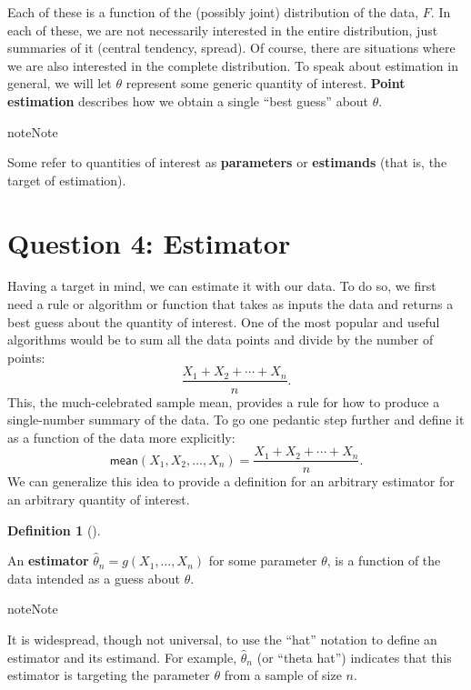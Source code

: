 \documentclass[
  13pt,
  letterpaper,
  DIV=11,
  numbers=noendperiod]{scrreprt}
\theoremstyle{plain}
\theoremstyle{plain}
\theoremstyle{definition}
\newtheorem{definition}{Definition}[chapter]
\theoremstyle{definition}
\theoremstyle{remark}
\begin{document}
Each of these is a function of the (possibly joint) distribution of the
data, \(F\). In each of these, we are not necessarily interested in the
entire distribution, just summaries of it (central tendency, spread). Of
course, there are situations where we are also interested in the
complete distribution. To speak about estimation in general, we will let
\(\theta\) represent some generic quantity of interest. \textbf{Point
estimation} describes how we obtain a single ``best guess'' about
\(\theta\).

\begin{bookcallout}{note}{Note}

Some refer to quantities of interest as \textbf{parameters} or
\textbf{estimands} (that is, the target of estimation).

\end{bookcallout}

\section{Question 4: Estimator}\label{question-4-estimator-1}

Having a target in mind, we can estimate it with our data. To do so, we
first need a rule or algorithm or function that takes as inputs the data
and returns a best guess about the quantity of interest. One of the most
popular and useful algorithms would be to sum all the data points and
divide by the number of points: \[
\frac{X_1 + X_2 + \cdots + X_n}{n}.
\] This, the much-celebrated sample mean, provides a rule for how to
produce a single-number summary of the data. To go one pedantic step
further and define it as a function of the data more explicitly: \[
\textsf{mean}(X_1, X_2, \ldots, X_n) = \frac{X_1 + X_2 + \cdots + X_n}{n}.
\] We can generalize this idea to provide a definition for an arbitrary
estimator for an arbitrary quantity of interest.

\begin{definition}[]\protect\hypertarget{def-estimator}{}\label{def-estimator}

An \textbf{estimator} \(\widehat{\theta}_n = g(X_1, \ldots, X_n)\) for
some parameter \(\theta\), is a function of the data intended as a guess
about \(\theta\).

\end{definition}

\begin{bookcallout}{note}{Note}

It is widespread, though not universal, to use the ``hat'' notation to
define an estimator and its estimand. For example,
\(\widehat{\theta}_n\) (or ``theta hat'') indicates that this estimator
is targeting the parameter \(\theta\) from a sample of size \(n\).

\end{bookcallout}
\end{document}
